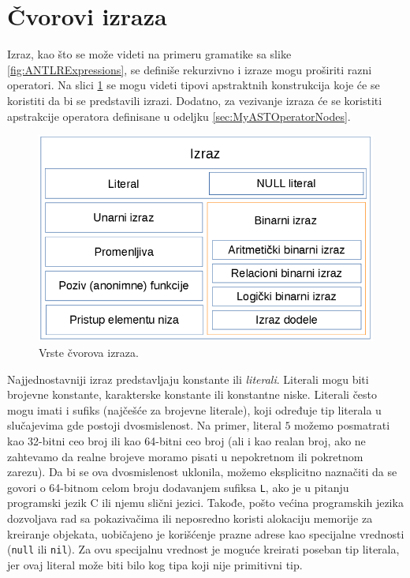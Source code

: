 \section{Čvorovi izraza}
\label{sec:MyASTExpressionNodes}

Izraz, kao što se može videti na primeru gramatike sa slike \ref{fig:ANTLRExpressions}, se definiše rekurzivno i izraze mogu proširiti razni operatori. Na slici \ref{fig:ExpressionNodes} se mogu videti tipovi apstraktnih konstrukcija koje će se koristiti da bi se predstavili izrazi. Dodatno, za vezivanje izraza će se koristiti apstrakcije operatora definisane u odeljku \ref{sec:MyASTOperatorNodes}.

\begin{figure}[h!]
\centering
\includegraphics[scale=0.5]{images/expression_nodes.png}
\caption{Vrste čvorova izraza.}
\label{fig:ExpressionNodes}
\end{figure}

Najjednostavniji izraz predstavljaju konstante ili \emph{literali}. Literali mogu biti brojevne konstante, karakterske konstante ili konstantne niske. Literali često mogu imati i sufiks (najčešće za brojevne literale), koji određuje tip literala u slučajevima gde postoji dvosmislenost. Na primer, literal $5$ možemo posmatrati kao 32-bitni ceo broj ili kao 64-bitni ceo broj (ali i kao realan broj, ako ne zahtevamo da realne brojeve moramo pisati u nepokretnom ili pokretnom zarezu). Da bi se ova dvosmislenost uklonila, možemo eksplicitno naznačiti da se govori o 64-bitnom celom broju dodavanjem sufiksa \texttt{L}, ako je u pitanju programski jezik C ili njemu slični jezici. Takođe, pošto većina programskih jezika dozvoljava rad sa pokazivačima ili neposredno koristi alokaciju memorije za kreiranje objekata, uobičajeno je korišćenje prazne adrese kao specijalne vrednosti (\texttt{null} ili \texttt{nil}). Za ovu specijalnu vrednost je moguće kreirati poseban tip literala, jer ovaj literal može biti bilo kog tipa koji nije primitivni tip.

